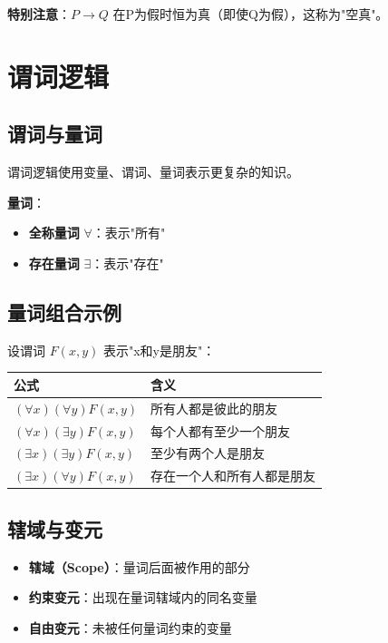 \begin{notebox}
\textbf{特别注意}：$P \to Q$ 在P为假时恒为真（即使Q为假），这称为"空真"。
\end{notebox}

\section{谓词逻辑}

\subsection{谓词与量词}
谓词逻辑使用变量、谓词、量词表示更复杂的知识。

\textbf{量词}：
\begin{itemize}[leftmargin=2em,itemsep=0pt]
    \item \textbf{全称量词} $\forall$：表示"所有"
    \item \textbf{存在量词} $\exists$：表示"存在"
\end{itemize}

\subsection{量词组合示例}
设谓词 $F(x, y)$ 表示"x和y是朋友"：

\begin{table}[htbp]
\centering\small
\begin{tabular}{ll}
\toprule
\textbf{公式} & \textbf{含义} \\
\midrule
$(\forall x)(\forall y)F(x,y)$ & 所有人都是彼此的朋友 \\
$(\forall x)(\exists y)F(x,y)$ & 每个人都有至少一个朋友 \\
$(\exists x)(\exists y)F(x,y)$ & 至少有两个人是朋友 \\
$(\exists x)(\forall y)F(x,y)$ & 存在一个人和所有人都是朋友 \\
\bottomrule
\end{tabular}
\end{table}

\subsection{辖域与变元}
\begin{itemize}[leftmargin=2em,itemsep=0pt]
    \item \textbf{辖域（Scope）}：量词后面被作用的部分
    \item \textbf{约束变元}：出现在量词辖域内的同名变量
    \item \textbf{自由变元}：未被任何量词约束的变量
\end{itemize}

